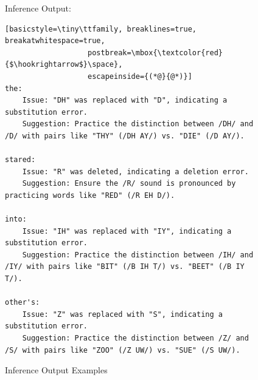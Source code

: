 \documentclass[11pt]{article}
\begin{document}
\begin{figure}[ht]
\begin{AIBox_2}{Inference Output:}
\begin{minipage}[t]{\textwidth}
\begin{lstlisting}[basicstyle=\tiny\ttfamily, breaklines=true, breakatwhitespace=true,
                   postbreak=\mbox{\textcolor{red}{$\hookrightarrow$}\space},
                   escapeinside={(*@}{@*)}]
the: 
    Issue: "DH" was replaced with "D", indicating a substitution error. 
    Suggestion: Practice the distinction between /DH/ and /D/ with pairs like "THY" (/DH AY/) vs. "DIE" (/D AY/).
    
stared: 
    Issue: "R" was deleted, indicating a deletion error. 
    Suggestion: Ensure the /R/ sound is pronounced by practicing words like "RED" (/R EH D/).

into: 
    Issue: "IH" was replaced with "IY", indicating a substitution error. 
    Suggestion: Practice the distinction between /IH/ and /IY/ with pairs like "BIT" (/B IH T/) vs. "BEET" (/B IY T/).
    
other's: 
    Issue: "Z" was replaced with "S", indicating a substitution error. 
    Suggestion: Practice the distinction between /Z/ and /S/ with pairs like "ZOO" (/Z UW/) vs. "SUE" (/S UW/).
\end{lstlisting}
\end{minipage}


\end{AIBox_2}
\caption{Inference Output Examples}
\label{fig:output}
\end{figure}
\end{document}
